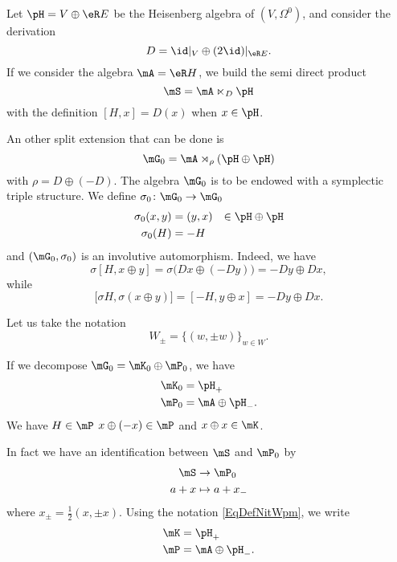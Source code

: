 Let $\pH=V\oplus\eR E$  be the Heisenberg algebra of $(V,\Omega^0)$, and consider the derivation
\begin{equation}
	D=\id|_V\oplus(2\id)|_{\eR E}.
\end{equation}
If we consider the algebra $\mA=\eR H$, we build the semi direct product
\begin{equation}
	\mS=\mA\ltimes_D\pH
\end{equation}
with the definition $[H,x]=D(x)$ when $x\in\pH$.

An other split extension that can be done is
\begin{equation}
	\mG_0=\mA\rtimes_{\rho}(\pH\oplus\pH)
\end{equation}
with $\rho=D\oplus(-D)$. The algebra $\mG_0$ is to be endowed with a symplectic triple structure. We define $\sigma_0\colon \mG_0\to \mG_0$
\begin{equation}
	\begin{aligned}[]
		\sigma_0(x,y)&=(y,x)&\in\pH\oplus\pH\\
		\sigma_0(H)&=-H
	\end{aligned}
\end{equation}
and $(\mG_0,\sigma_0)$ is an involutive automorphism. Indeed, we have
\begin{equation}
	\sigma[H,x\oplus y]=\sigma\big( Dx\oplus(-Dy) \big)=-Dy\oplus Dx,
\end{equation}
while
\begin{equation}
	\big[ \sigma H,\sigma(x\oplus y) \big]=[-H,y\oplus x]=-Dy\oplus Dx.
\end{equation}

Let us take the notation
\begin{equation}		\label{EqDefNitWpm}
	W_{\pm}=\{ (w,\pm w) \}_{w\in W}.
\end{equation}

If we decompose $\mG_0=\mK_0\oplus\mP_0$, we have
\begin{equation}
	\begin{aligned}[]
		\mK_0&=\pH_+\\
		\mP_0&=\mA\oplus\pH_-.
	\end{aligned}
\end{equation}
We have $H\in\mP$ $x\oplus(-x)\in\mP$ and $x\oplus x\in\mK$.

In fact we have an identification between $\mS$ and $\mP_0$ by
\begin{equation}
	\begin{aligned}
		\mS&\to \mP_0 \\
		a+x&\mapsto a+x_- 
	\end{aligned}
\end{equation}
where $x_{\pm}=\frac{ 1 }{2}(x,\pm x)$. Using the notation \eqref{EqDefNitWpm}, we write
\begin{equation}
	\begin{aligned}[]
		\mK&=\pH_{+}\\
		\mP&=\mA\oplus\pH_{-}.
	\end{aligned}
\end{equation}

